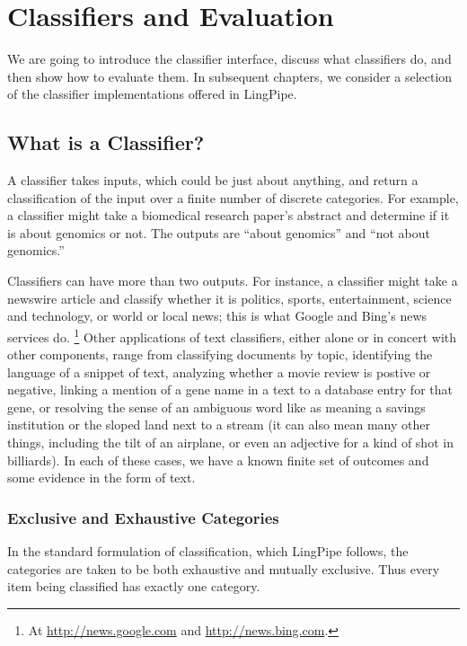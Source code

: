 \chapter{Classifiers and Evaluation}\label{chap:classifier-evaluation}

We are going to introduce the classifier interface, discuss what
classifiers do, and then show how to evaluate them.  In subsequent
chapters, we consider a selection of the classifier implementations
offered in LingPipe.

\section{What is a Classifier?}

A classifier takes inputs, which could be just about anything, and
return a classification of the input over a finite number of discrete
categories.  For example, a classifier might take a biomedical
research paper's abstract and determine if it is about genomics or
not.  The outputs are ``about genomics'' and ``not about genomics.''

Classifiers can have more than two outputs.  For instance, a
classifier might take a newswire article and classify whether it is
politics, sports, entertainment, science and technology, or world or
local news; this is what Google and Bing's news services do.%
%
\footnote{At \url{http://news.google.com} and
  \url{http://news.bing.com}.}
%
Other applications of text classifiers, either alone or in concert
with other components, range from classifying documents by topic,
identifying the language of a snippet of text, analyzing whether a
movie review is postive or negative, linking a mention of a gene name
in a text to a database entry for that gene, or resolving the sense of
an ambiguous word like  as meaning a savings
institution or the sloped land next to a stream (it can also mean many
other things, including the tilt of an airplane, or even an adjective
for a kind of shot in billiards).  In each of these cases, we have a
known finite set of outcomes and some evidence in the form of text.

\subsection{Exclusive and Exhaustive Categories}

In the standard formulation of classification, which LingPipe follows,
the categories are taken to be both exhaustive and mutually exclusive.
Thus every item being classified has exactly one category.

